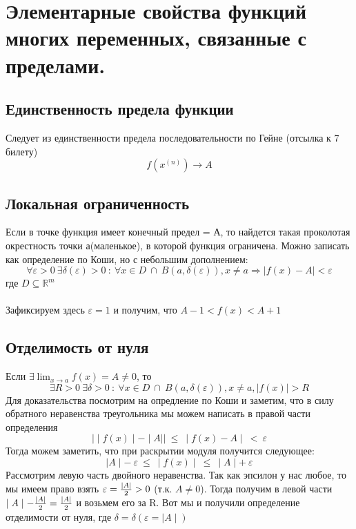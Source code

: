 \newcommand\R{\ensuremath{\mathbb{R}}}
\section{Элементарные свойства функций многих переменных, связанные с пределами.}

\subsection{Единственность предела функции}

Следует из единственности предела последовательности по Гейне 
(отсылка к 7 билету)
$$
f(x^{(n)}) \longrightarrow A
$$


\subsection{Локальная ограниченность}

Если в точке функция имеет конечный предел = А, то найдется 
такая проколотая окрестность точки а(маленькое), в которой функция 
ограничена. Можно записать как определение по Коши, но с небольшим 
дополнением:
$$
\forall \varepsilon > 0 \ \exists \delta(\varepsilon) > 0
\ : \ \forall x\in D \ \cap \ B(a,\delta(\varepsilon)), x\ne a
\Rightarrow \mid f(x) - A \mid < \varepsilon
$$
где $D \subseteq \R^m$
\\
\\
Зафиксируем здесь $\varepsilon = 1$ и получим, что 
$A-1<f(x)<A+1$


\subsection{Отделимость от нуля}

Если $\exists \lim_{x\to a}{f(x)} = A \ne 0$, то 
$$
\exists R>0 \ \exists \delta > 0 \ : \ \forall x\in D \ \cap \ 
B(a,\delta(\varepsilon)), x\ne a, \mid f(x) \mid > R
$$
Для доказательства посмотрим на опредление по Коши и заметим, что 
в силу обратного неравенства треугольника мы можем написать в 
правой части определения 
$$
\vert\mid f(x)\mid - \mid A\mid\vert \ \leq \ \mid f(x) - A\mid \ < \ \varepsilon
$$
Тогда можем заметить, что при раскрытии модуля получится следующее:
$$
\mid A\mid - \ \varepsilon \ \leq \ \mid f(x)\mid \ \leq \ \mid A\mid + \ \varepsilon
$$
Рассмотрим левую часть двойного неравенства. Так как эпсилон у нас любое, то мы имеем право взять 
$\varepsilon = {\mid A\mid\over2} > 0 \ $(т.к. $A\ne0$). Тогда получим в левой части
$\mid A\mid - {\mid A\mid\over2} = {\mid A\mid\over2}$ и возьмем его за R. Вот мы и получили
определение отделимости от нуля, где $\delta = \delta(\varepsilon = \mid A\mid)$


